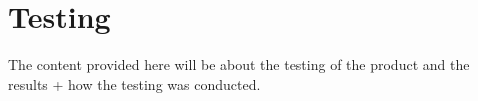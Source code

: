 \chapter{Testing}
The content provided here will be about the testing of the product and the results + how the testing was conducted.